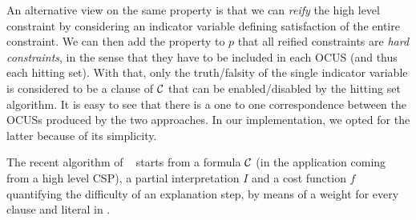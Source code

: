 {An alternative view on the same property is that we can \emph{reify} the high level constraint by considering an indicator variable defining satisfaction of the entire constraint. 
We can then add the property to $p$ that all reified constraints are \emph{hard constraints}, in the sense that they have to be included in each OCUS (and thus each hitting set). With that, only the truth/falsity of the single indicator variable is considered to be a clause of $\mathcal{C} $ that can be enabled/disabled by the hitting set algorithm. 
It is easy to see that there is a one to one correspondence between the OCUSs produced by the two approaches. In our implementation, we opted for the latter because of its simplicity. 
}

The recent algorithm of ~\citet{ecai/BogaertsGCG20} starts from a formula $\mathcal{C} $ (in the application coming from a high level CSP), a partial interpretation $I$  and a cost function $f$ quantifying the difficulty of an explanation step, by means of a weight for every clause and literal in \formula. %

